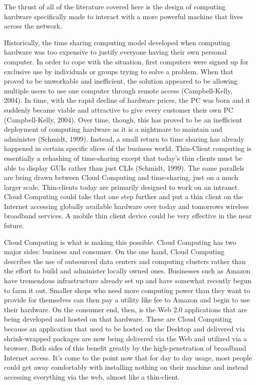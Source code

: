 \documentclass[12pt,oneside,letterpaper]{article}
\begin{document}
The thrust of all of the literature covered here is the design of computing
hardware specifically made to interact with a more powerful machine that lives
across the network.

Historically, the time sharing computing model developed when computing hardware
was too expensive to justify everyone having their own personal computer.  In
order to cope with the situation, first computers were signed up for exclusive
use by individuals or groups trying to solve a problem.  When that proved to be
unworkable and inefficient, the solution appeared to be allowing multiple users
to use one computer through remote access (Campbell-Kelly, 2004).  In time, with
the rapid decline of hardware prices, the PC was born and it suddenly became
viable and attractive to give every customer their own PC (Campbell-Kelly,
2004).  Over time, though, this has proved to be an inefficient deployment of
computing hardware as it is a nightmare to maintain and administer (Schmidt,
1999).  Instead, a small return to time sharing has already happened in certain
specific slices of the business world.  Thin-Client computing is essentially a
rehashing of time-sharing except that today's thin clients must be able to
display GUIs rather than just CLIs (Schmidt, 1999).  The same parallels are
being drawn between Cloud Computing and time-sharing, just on a much larger
scale.  Thin-clients today are primarily designed to work on an intranet.  Cloud
Computing could take that one step further and put a thin client on the Internet
accessing globally available hardware over today and tomorrows wireless
broadband services.  A mobile thin client device could be very effective in the
near future.

Cloud Computing is what is making this possible.  Cloud Computing has two major
sides: business and consumer.  On the one hand, Cloud Computing describes the
use of outsourced data centers and computing clusters rather than the effort to
build and administer locally owned ones.  Businesses such as Amazon have
tremendous infrastructure already set up and have somewhat recently begun to
farm it out.  Smaller shops who need more computing power than they want to
provide for themselves can then pay a utility like fee to Amazon and begin to
use their hardware.  On the consumer end, then, is the Web 2.0 applications that
are being developed and hosted on that hardware.  These are Cloud Computing
because an application that used to be hosted on the Desktop and delivered via
shrink-wrapped packages are now being delivered via the Web and utilized via a
browser.  Both sides of this benefit greatly by the high-penetration of
broadband Internet access.  It's come to the point now that for day to day
usage, most people could get away comfortably with installing nothing on their
machine and instead accessing everything via the web, almost like a thin-client.
\end{document}
